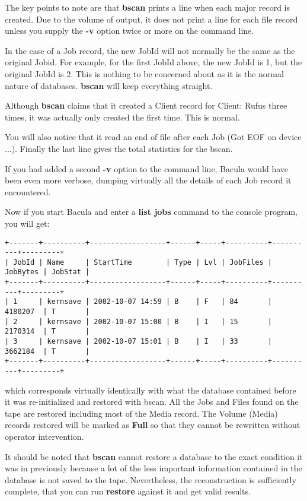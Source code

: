 The key points to note are that {\bf bscan} prints a line when each major
record is created. Due to the volume of output, it does not print a line for
each file record unless you supply the {\bf -v} option twice or more on the
command line. 

In the case of a Job record, the new JobId will not normally be the same as
the original Jobid. For example, for the first JobId above, the new JobId is
1, but the original JobId is 2. This is nothing to be concerned about as it is
the normal nature of databases. {\bf bscan} will keep everything straight. 

Although {\bf bscan} claims that it created a Client record for Client: Rufus
three times, it was actually only created the first time. This is normal. 

You will also notice that it read an end of file after each Job (Got EOF on
device ...). Finally the last line gives the total statistics for the bscan. 

If you had added a second {\bf -v} option to the command line, Bacula would
have been even more verbose, dumping virtually all the details of each Job
record it encountered. 

Now if you start Bacula and enter a {\bf list jobs} command to the console
program, you will get: 

\footnotesize
\begin{verbatim}
+-------+----------+------------------+------+-----+----------+----------+---------+
| JobId | Name     | StartTime        | Type | Lvl | JobFiles | JobBytes | JobStat |
+-------+----------+------------------+------+-----+----------+----------+---------+
| 1     | kernsave | 2002-10-07 14:59 | B    | F   | 84       | 4180207  | T       |
| 2     | kernsave | 2002-10-07 15:00 | B    | I   | 15       | 2170314  | T       |
| 3     | kernsave | 2002-10-07 15:01 | B    | I   | 33       | 3662184  | T       |
+-------+----------+------------------+------+-----+----------+----------+---------+
\end{verbatim}
\normalsize

which corresponds virtually identically with what the database contained
before it was re-initialized and restored with bscan. All the Jobs and Files
found on the tape are restored including most of the Media record. The Volume
(Media) records restored will be marked as {\bf Full} so that they cannot be
rewritten without operator intervention. 

It should be noted that {\bf bscan} cannot restore a database to the exact
condition it was in previously because a lot of the less important information
contained in the database is not saved to the tape. Nevertheless, the
reconstruction is sufficiently complete, that you can run {\bf restore}
against it and get valid results. 

